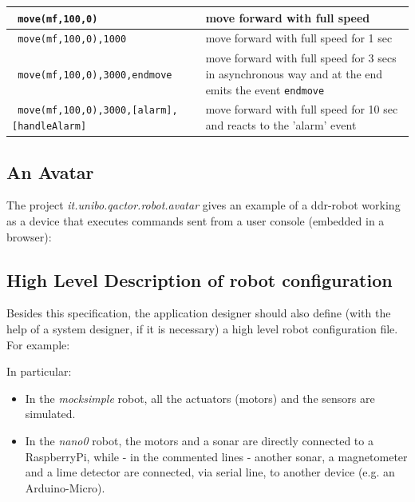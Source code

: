\medskip 
\noindent
\begin{footnotesize}
\begin{tabular}{|p{}|p{}|}
\hline 
\texttt{ move(mf,100,0) } & move forward with full speed   \\ 
\hline 
\texttt{ move(mf,100,0),1000 } & move forward with full speed for 1 sec  \\ 
\hline 
\texttt{ move(mf,100,0),3000,endmove } & move forward with full speed for 3 secs in asynchronous way and at the end emits the event \texttt{endmove} \\
\hline 
\texttt{ move(mf,100,0),3000,[alarm],[handleAlarm] } & move forward with full speed for 10 sec and reacts to the 'alarm' event \\ 
\hline 
\end{tabular} 
\end{footnotesize}

\subsection{An Avatar}

The project \textit{it.unibo.qactor.robot.avatar}  gives an example of a ddr-robot working as a device that executes commands sent from a user console (embedded in a browser):



\subsection{High Level Description of robot configuration }

Besides this specification, the application designer should also define (with the help of a system designer, if it is necessary) a high level robot configuration file. For example:



In particular:

\begin{itemize}
\item In the \textit{mocksimple} robot, all the actuators (motors) and the sensors are simulated.
\item In the \textit{nano0} robot, the motors and a sonar are directly connected to a RaspberryPi, while - in the commented lines - another sonar, a magnetometer and a lime detector are  connected, via serial line, to another device (e.g. an Arduino-Micro).
\end{itemize}

